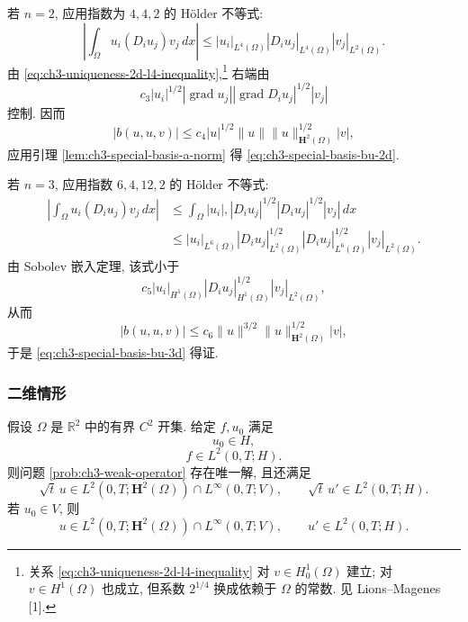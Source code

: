 \begin{Proof}
若 $n=2$, 应用指数为 $4,4,2$ 的 Hölder 不等式:
\[
\left|\int_\Omega u_i(D_iu_j)v_j\,dx\right|
\leq|u_i|_{L^4(\Omega)}|D_iu_j|_{L^4(\Omega)}|v_j|_{L^2(\Omega)}.
\]
由 \eqref{eq:ch3-uniqueness-2d-l4-inequality},\footnote{关系 \eqref{eq:ch3-uniqueness-2d-l4-inequality} 对 $v\in H_0^1(\Omega)$ 建立; 对 $v\in H^1(\Omega)$ 也成立, 但系数 $2^{1/4}$ 换成依赖于 $\Omega$ 的常数. 见 Lions--Magenes [1].} 右端由
\[
c_3|u_i|^{1/2}|\operatorname{grad}u_j|
|\operatorname{grad}D_iu_j|^{1/2}|v_j|
\]
控制. 因而
\[
|b(u,u,v)|\leq c_4|u|^{1/2}\lVert u\rVert
\lVert u\rVert_{\mathbf H^2(\Omega)}^{1/2}|v|,
\]
应用引理 \ref{lem:ch3-special-basis-a-norm} 得 \eqref{eq:ch3-special-basis-bu-2d}.

若 $n=3$, 应用指数 $6,4,12,2$ 的 Hölder 不等式:
\[
\begin{aligned}
\left|\int_\Omega u_i(D_iu_j)v_j\,dx\right|
&\leq\int_\Omega|u_i|,|D_iu_j|^{1/2}|D_iu_j|^{1/2}|v_j|\,dx\\
&\leq|u_i|_{L^6(\Omega)}|D_iu_j|_{L^2(\Omega)}^{1/2}
|D_iu_j|_{L^6(\Omega)}^{1/2}|v_j|_{L^2(\Omega)}.
\end{aligned}
\]
由 Sobolev 嵌入定理, 该式小于
\[
c_5|u_i|_{H^1(\Omega)}|D_iu_j|_{H^1(\Omega)}^{1/2}|v_j|_{L^2(\Omega)},
\]
从而
\[
|b(u,u,v)|\leq c_6\lVert u\rVert^{3/2}
\lVert u\rVert_{\mathbf H^2(\Omega)}^{1/2}|v|,
\]
于是 \eqref{eq:ch3-special-basis-bu-3d} 得证.
\end{Proof}

\hypertarget{chapter-03-page-228}{}
\subsubsection{二维情形}
\label{subsubsec:ch3-special-basis-2d}

\begin{Theorem}
\label{thm:ch3-special-basis-2d}
假设 $\Omega$ 是 $\mathbb R^2$ 中的有界 $C^2$ 开集. 给定 $f,u_0$ 满足
\begin{equation}
u_0\in H,
\label{eq:ch3-special-basis-2d-initial-h}
\end{equation}
\begin{equation}
f\in L^2(0,T;H).
\label{eq:ch3-special-basis-2d-force-l2}
\end{equation}
则问题 \ref{prob:ch3-weak-operator} 存在唯一解, 且还满足
\begin{equation}
\sqrt t\,u\in L^2(0,T;\mathbf H^2(\Omega))\cap L^\infty(0,T;V),
\qquad\sqrt t\,u'\in L^2(0,T;H).
\label{eq:ch3-special-basis-2d-weighted-regularity}
\end{equation}
若 $u_0\in V$, 则
\begin{equation}
u\in L^2(0,T;\mathbf H^2(\Omega))\cap L^\infty(0,T;V),
\qquad u'\in L^2(0,T;H).
\label{eq:ch3-special-basis-2d-regularity}
\end{equation}
\end{Theorem}

